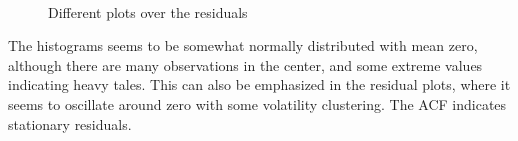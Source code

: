 \begin{figure}[H]
  \centering
  \quad
  \\
  \quad
  \caption{Different plots over the residuals}
  \label{fig:plot_over_residuals}
\end{figure}
\noindent The histograms seems to be somewhat normally distributed with mean zero, although there are many observations in the center, and some extreme values indicating heavy tales. This can also be emphasized in the residual plots, where it seems to oscillate around zero with some volatility clustering.
The ACF indicates stationary residuals.


